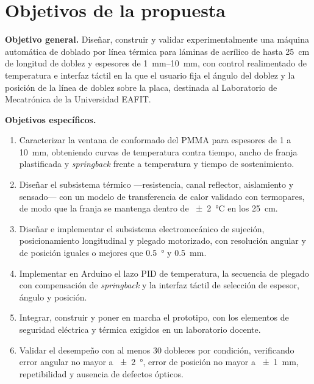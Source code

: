 \section{Objetivos de la propuesta}

\noindent\textbf{Objetivo general.} Diseñar, construir y validar experimentalmente una máquina automática de doblado por línea térmica para láminas de acrílico de hasta \SI{25}{\centi\meter} de longitud de doblez y espesores de \SIrange{1}{10}{\milli\meter}, con control realimentado de temperatura e interfaz táctil en la que el usuario fija el ángulo del doblez y la posición de la línea de doblez sobre la placa, destinada al Laboratorio de Mecatrónica de la Universidad EAFIT.

\noindent\textbf{Objetivos específicos.}
\begin{enumerate}
\item Caracterizar la ventana de conformado del PMMA para espesores de \num{1} a \SI{10}{\milli\meter}, obteniendo curvas de temperatura contra tiempo, ancho de franja plastificada y \emph{springback} frente a temperatura y tiempo de sostenimiento.
\item Diseñar el subsistema térmico —resistencia, canal reflector, aislamiento y sensado— con un modelo de transferencia de calor validado con termopares, de modo que la franja se mantenga dentro de \SI{\pm 2}{\celsius} en los \SI{25}{\centi\meter}.
\item Diseñar e implementar el subsistema electromecánico de sujeción, posicionamiento longitudinal y plegado motorizado, con resolución angular y de posición iguales o mejores que \SI{0.5}{\degree} y \SI{0.5}{\milli\meter}.
\item Implementar en Arduino el lazo PID de temperatura, la secuencia de plegado con compensación de \emph{springback} y la interfaz táctil de selección de espesor, ángulo y posición.
\item Integrar, construir y poner en marcha el prototipo, con los elementos de seguridad eléctrica y térmica exigidos en un laboratorio docente.
\item Validar el desempeño con al menos \num{30} dobleces por condición, verificando error angular no mayor a \SI{\pm 2}{\degree}, error de posición no mayor a \SI{\pm 1}{\milli\meter}, repetibilidad y ausencia de defectos ópticos.
\end{enumerate}
